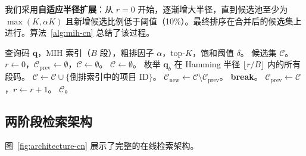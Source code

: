 \documentclass[11pt,a4paper]{article}
\begin{document}
我们采用\textbf{自适应半径扩展}：从 $r=0$ 开始，逐渐增大半径，直到候选池至少为 $\max(K, \alpha K)$ 且新增候选比例低于阈值（10\%）。最终排序在合并后的候选集上进行。算法~\ref{alg:mih-cn} 总结了该过程。

\begin{algorithm}[htbp]
\caption{自适应 MIH 搜索。}
\label{alg:mih-cn}
\begin{algorithmic}[1]
\Require 查询码 $\mathbf{q}$，MIH 索引（$B$ 段），粗排因子 $\alpha$，top-$K$，饱和阈值 $\delta$。
\Ensure 候选集 $\mathcal{C}$。
\State $r \leftarrow 0$，$\mathcal{C}_{\text{prev}} \leftarrow \emptyset$，$\mathcal{C} \leftarrow \emptyset$。
\Loop
    \State $\mathcal{C} \leftarrow \emptyset$。
        \State 枚举 $\mathbf{q}_b$ 在 Hamming 半径 $\lfloor r/B \rfloor$ 内的所有段码。
        \State $\mathcal{C} \leftarrow \mathcal{C} \cup \{\text{倒排索引中的项目 ID}\}$。
    \EndFor
    \State $\mathcal{C}_{\text{new}} \leftarrow \mathcal{C} \setminus \mathcal{C}_{\text{prev}}$。
        \State \textbf{break}。
    \EndIf
    \State $\mathcal{C}_{\text{prev}} \leftarrow \mathcal{C}$，$r \leftarrow r + 1$。
\EndLoop
\State \Return $\mathcal{C}$。
\end{algorithmic}
\end{algorithm}

\subsection{两阶段检索架构}

图~\ref{fig:architecture-cn} 展示了完整的在线检索架构。
\end{document}
